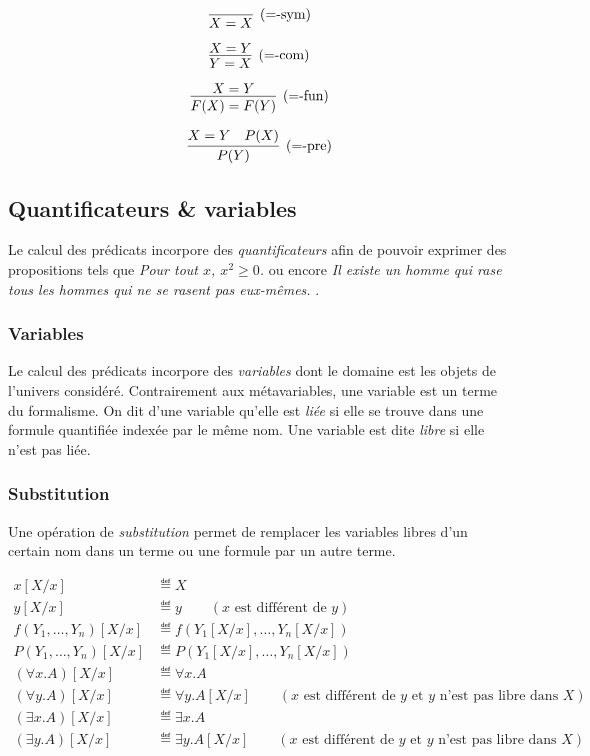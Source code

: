 \[
\infer[({=}\text{-sym})]{X = X}{}
\]

\[
\infer[({=}\text{-com})]{Y = X}{X = Y}
\]

\[
\infer[({=}\text{-fun})]{F(X) = F(Y)}{X = Y}
\]

\[
\infer[({=}\text{-pre})]{P(Y)}{X = Y & P(X)}
\]

\subsection{Quantificateurs \& variables}

Le calcul des prédicats incorpore des \og \textit{quantificateurs} \fg{} afin de pouvoir exprimer des propositions tels que \og \textit{Pour tout $x$, $x^2 \geq 0$.} \fg{} ou encore \og \textit{Il existe un homme qui rase tous les hommes qui ne se rasent pas eux-mêmes.} \fg{}.

\subsubsection{Variables}

Le calcul des prédicats incorpore des \og \textit{variables} \fg{} dont le domaine est les objets de l'univers considéré.
Contrairement aux métavariables, une variable est un terme du formalisme.
On dit d'une variable qu'elle est \og \textit{liée} \fg{} si elle se trouve dans une formule quantifiée indexée par le même nom.
Une variable est dite \og \textit{libre} \fg{} si elle n'est pas liée.

\subsubsection{Substitution}

Une opération de \og \textit{substitution} \fg{} permet de remplacer les variables libres d'un certain nom dans un terme ou une formule par un autre terme.

\begin{align*}
x[X / x] &\eqdef X \\
y[X / x] &\eqdef y \hspace{2em} (x \text{ est différent de } y)\\
f(Y_1, \dots, Y_n)[X / x] &\eqdef f(Y_1[X / x], \dots, Y_n[X / x])\\
P(Y_1, \dots, Y_n)[X / x] &\eqdef P(Y_1[X / x], \dots, Y_n[X / x])\\
(\forall x. A)[X / x] &\eqdef \forall x. A\\
(\forall y. A)[X / x] &\eqdef \forall y. A[X / x] \hspace{2em} (x \text{ est différent de } y \text{ et $y$ n'est pas libre dans $X$})\\
(\exists x. A)[X / x] &\eqdef \exists x. A\\
(\exists y. A)[X / x] &\eqdef \exists y. A[X / x] \hspace{2em} (x \text{ est différent de } y \text{ et $y$ n'est pas libre dans $X$})
\end{align*}

